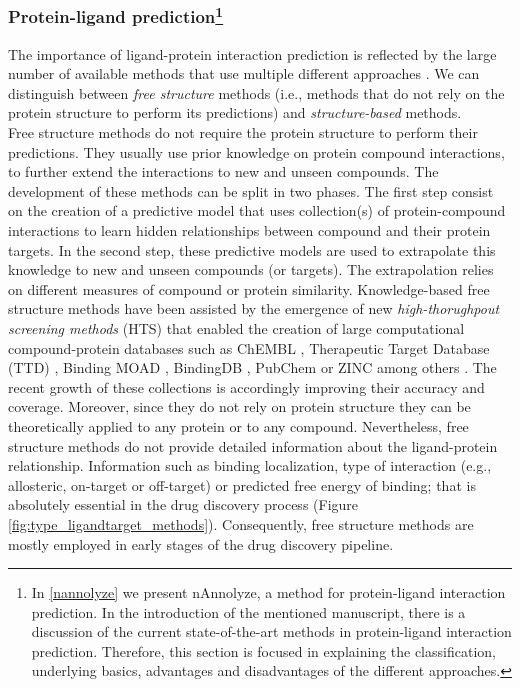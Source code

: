 \documentclass[11pt, b5paper,twoside]{tesi_upf}
\begin{document}
\subsubsection[Protein-ligand prediction]{Protein-ligand prediction\protect\footnote{In \cref{nannolyze} we present nAnnolyze, a method for protein-ligand interaction prediction. In the introduction of the mentioned manuscript, there is a discussion of the current state-of-the-art methods in protein-ligand interaction prediction. Therefore, this section is focused in explaining the classification, underlying basics, advantages and disadvantages of the different approaches.}}\label{prediction ligand-target}

The importance of ligand-protein interaction prediction is reflected by the large number of available methods that use multiple different approaches \cite{Csermely2013, prathipati2015}. We can distinguish between \textit{free structure} methods (i.e., methods that do not rely on the protein structure to perform its predictions) and \textit{structure-based} methods. \\    
Free structure methods do not require the protein structure to perform their predictions. They usually use prior knowledge on protein compound interactions, to further extend the interactions to new and unseen compounds. The development of these methods can be split in two phases. The first step consist on the creation of a predictive model that uses collection(s) of protein-compound interactions to learn hidden relationships between compound and their protein targets.  In the second step, these predictive models are used to extrapolate this knowledge to new and unseen compounds (or targets). The extrapolation relies on different measures of compound or protein similarity. Knowledge-based free structure methods have been assisted by the emergence of new \textit{high-thorughpout screening methods} (HTS) that enabled the creation of large computational compound-protein databases such as ChEMBL \cite{Bento2014}, Therapeutic Target Database (TTD) \cite{Zhu2012a}, Binding MOAD \cite{Hu2005}, BindingDB \cite{Liu2007}, PubChem \cite{Kim2016, Wang2014} or ZINC among others \cite{Irwin2012}. The recent growth of these collections is accordingly improving their accuracy and coverage. Moreover, since they do not rely on protein structure they can be theoretically applied to any protein or to any compound. Nevertheless, free structure methods do not provide detailed information about the ligand-protein relationship. Information such as binding localization, type of interaction (e.g., allosteric, on-target or off-target) or predicted free energy of binding;  that is absolutely essential in the drug discovery process (Figure \ref{fig:type_ligandtarget_methods}). Consequently, free structure methods are mostly employed in early stages of the drug discovery pipeline. 
\end{document}
